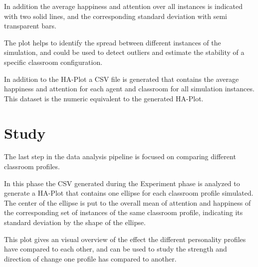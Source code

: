 In addition the average happiness and attention over all instances is
indicated with two solid lines, and the corresponding standard deviation with
semi transparent bars.

The plot helps to identify the spread between different instances of the simulation, and
could be used to detect outliers and estimate the stability of a specific classroom
configuration.

In addition to the HA-Plot a CSV file is generated that contains the average
happiness and attention for each agent and classroom for all simulation instances.
This dataset is the numeric equivalent to the generated HA-Plot.


\section{Study}
The last step in the data analysis pipeline is focused on comparing different classroom
profiles.

In this phase the CSV generated during the Experiment phase is analyzed to
generate a HA-Plot that contains one ellipse for each classroom profile simulated.
The center of the ellipse is put to the overall mean of attention and happiness
of the corresponding set of instances of the same classroom profile, indicating its standard
deviation by the shape of the ellipse.

This plot gives an visual overview of the effect the different personality profiles
have compared to each other, and can be used to study the strength and direction of
change one profile has compared to another.

\begin{figure}[H]
\end{figure}

